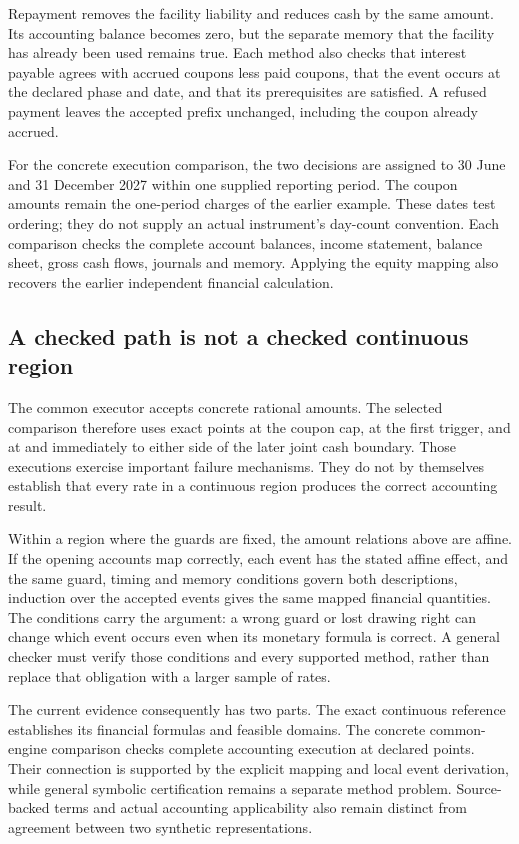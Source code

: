 Repayment removes the facility liability and reduces cash by the same amount. Its accounting balance becomes zero, but the separate memory that the facility has already been used remains true. Each method also checks that interest payable agrees with accrued coupons less paid coupons, that the event occurs at the declared phase and date, and that its prerequisites are satisfied. A refused payment leaves the accepted prefix unchanged, including the coupon already accrued.

For the concrete execution comparison, the two decisions are assigned to 30 June and 31 December 2027 within one supplied reporting period. The coupon amounts remain the one-period charges of the earlier example. These dates test ordering; they do not supply an actual instrument's day-count convention. Each comparison checks the complete account balances, income statement, balance sheet, gross cash flows, journals and memory. Applying the equity mapping also recovers the earlier independent financial calculation.

\subsection{A checked path is not a checked continuous region}

The common executor accepts concrete rational amounts. The selected comparison therefore uses exact points at the coupon cap, at the first trigger, and at and immediately to either side of the later joint cash boundary. Those executions exercise important failure mechanisms. They do not by themselves establish that every rate in a continuous region produces the correct accounting result.

Within a region where the guards are fixed, the amount relations above are affine. If the opening accounts map correctly, each event has the stated affine effect, and the same guard, timing and memory conditions govern both descriptions, induction over the accepted events gives the same mapped financial quantities. The conditions carry the argument: a wrong guard or lost drawing right can change which event occurs even when its monetary formula is correct. A general checker must verify those conditions and every supported method, rather than replace that obligation with a larger sample of rates.

The current evidence consequently has two parts. The exact continuous reference establishes its financial formulas and feasible domains. The concrete common-engine comparison checks complete accounting execution at declared points. Their connection is supported by the explicit mapping and local event derivation, while general symbolic certification remains a separate method problem. Source-backed terms and actual accounting applicability also remain distinct from agreement between two synthetic representations.

